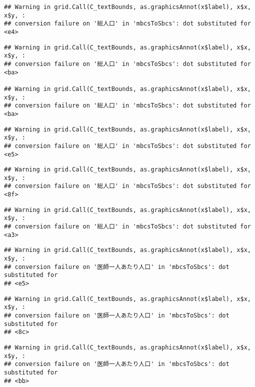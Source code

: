 \documentclass[
]{article}
\begin{document}
\begin{verbatim}
## Warning in grid.Call(C_textBounds, as.graphicsAnnot(x$label), x$x, x$y, :
## conversion failure on '総人口' in 'mbcsToSbcs': dot substituted for <e4>
\end{verbatim}

\begin{verbatim}
## Warning in grid.Call(C_textBounds, as.graphicsAnnot(x$label), x$x, x$y, :
## conversion failure on '総人口' in 'mbcsToSbcs': dot substituted for <ba>

## Warning in grid.Call(C_textBounds, as.graphicsAnnot(x$label), x$x, x$y, :
## conversion failure on '総人口' in 'mbcsToSbcs': dot substituted for <ba>
\end{verbatim}

\begin{verbatim}
## Warning in grid.Call(C_textBounds, as.graphicsAnnot(x$label), x$x, x$y, :
## conversion failure on '総人口' in 'mbcsToSbcs': dot substituted for <e5>
\end{verbatim}

\begin{verbatim}
## Warning in grid.Call(C_textBounds, as.graphicsAnnot(x$label), x$x, x$y, :
## conversion failure on '総人口' in 'mbcsToSbcs': dot substituted for <8f>
\end{verbatim}

\begin{verbatim}
## Warning in grid.Call(C_textBounds, as.graphicsAnnot(x$label), x$x, x$y, :
## conversion failure on '総人口' in 'mbcsToSbcs': dot substituted for <a3>
\end{verbatim}

\begin{verbatim}
## Warning in grid.Call(C_textBounds, as.graphicsAnnot(x$label), x$x, x$y, :
## conversion failure on '医師一人あたり人口' in 'mbcsToSbcs': dot substituted for
## <e5>
\end{verbatim}

\begin{verbatim}
## Warning in grid.Call(C_textBounds, as.graphicsAnnot(x$label), x$x, x$y, :
## conversion failure on '医師一人あたり人口' in 'mbcsToSbcs': dot substituted for
## <8c>
\end{verbatim}

\begin{verbatim}
## Warning in grid.Call(C_textBounds, as.graphicsAnnot(x$label), x$x, x$y, :
## conversion failure on '医師一人あたり人口' in 'mbcsToSbcs': dot substituted for
## <bb>
\end{verbatim}
\end{document}
